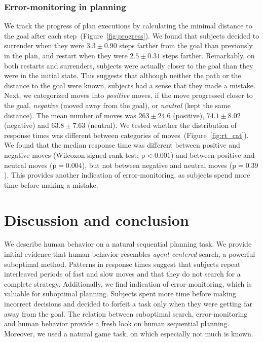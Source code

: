 \documentclass[10pt,letterpaper]{article}
\begin{document}
\subsubsection{Error-monitoring in planning}

We track the progress of plan executions by calculating the minimal distance to the goal after each step~(Figure~\ref{fig:progress}). We found that subjects decided to surrender when they were $3.3\pm0.90$ steps farther from the goal than previously in the plan, and restart when they were $2.5\pm0.31$ steps farther. Remarkably, on both restarts and surrenders, subjects were actually closer to the goal than they were in the initial state. This suggests that although neither the path or the distance to the goal were known, subjects had a sense that they made a mistake.  
Next, we categorized moves into \emph{positive} moves, if the move progressed closer to the goal, \emph{negative} (moved away from the goal), or \emph{neutral} (kept the same distance). The mean number of moves was $263\pm24.6$ (positive), $74.1\pm8.02$ (negative) and $63.8\pm7.63$ (neutral).
We tested whether the distribution of response times was different between categories of moves~(Figure~\ref{fig:rt_cat}). We found that the median response time was different between positive and negative moves (Wilcoxon signed-rank test; p$<0.001$) and between positive and neutral moves (p$=0.004$), but not between  negative and neutral moves (p$=0.39$). This provides another indication of error-monitoring, as subjects spend more time before making a mistake. 
\vspace{-0.15cm}
\section{Discussion and conclusion}
\vspace{-0.05cm}
We describe human behavior on a natural sequential planning task. We provide initial evidence that human behavior resembles \emph{agent-centered} search, a powerful suboptimal method. Patterns in response times suggest that subjects repeat interleaved periods of fast and slow moves and that they do not search for a complete strategy. Additionally, we find indication of error-monitoring, which is valuable for suboptimal planning. Subjects spent more time before making incorrect decisions and decided to forfeit a task only when they were getting far away from the goal. The relation between suboptimal search, error-monitoring and human behavior provide a fresh look on human sequential planning. Moreover, we used a natural game task, on which especially not much is known.
\end{document}
